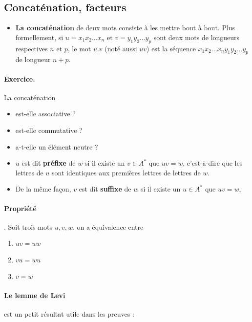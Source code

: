 \documentclass[10pt,twoside]{article}
\begin{document}
\subsection{Concaténation, facteurs}

\begin{itemize}
\item
\textbf{La concaténation} de deux mots consiste à les mettre bout à bout. 
Plus formellement,
si $u = x_1 x_2 \ldots x_n$ et $v = y_1 y_2 \ldots y_p$ sont deux mots
de longueurs respectives $n$ et $p$, le mot $u.v$ (noté aussi $uv$)
est la séquence $ x_1 x_2 \ldots x_n y_1 y_2 \ldots y_p$ de longueur
$n+p$.
\end{itemize}


\paragraph{Exercice. } La concaténation 
\begin{itemize}
\item est-elle associative ?
\item est-elle commutative ?
\item a-t-elle un élément neutre ?
\end{itemize}


\begin{itemize}
\item $u$ est dit \textbf{préfixe} de $w$ si il existe un $v \in A^*$
  que $uv = w$, c'est-à-dire que les lettres de $u$ sont identiques
  aux premières lettres de lettres de $w$.
\item De la même façon, $v$ est dit \textbf{suffixe} de $w$ si il
  existe un $u \in A^*$ que $uv = w$,
\end{itemize}

\paragraph{Propriété}. Soit trois  mots $u, v, w$. on a équivalence entre
\begin{enumerate}
\item $ u v = u w $
\item $ v u = w u $
\item $ v = w $
\end{enumerate}


\paragraph{Le lemme de Levi} est un petit résultat utile dans les preuves :
\end{document}
